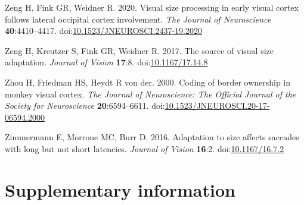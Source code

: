 \documentclass[
]{article}
\newlength{\cslhangindent}
\newlength{\cslentryspacingunit} %
\newenvironment{CSLReferences}[2] %
 {%
  \setlength{\parindent}{0pt}
  \ifodd #1
  \let\oldpar\par
  \def\par{\hangindent=\cslhangindent\oldpar}
  \fi
  \setlength{\parskip}{#2\cslentryspacingunit}
 }%
 {}
\begin{document}
\begin{CSLReferences}{1}{0}
\leavevmode{}%
Zeng H, Fink GR, Weidner R. 2020. Visual size processing in early visual cortex follows lateral occipital cortex involvement. \emph{The Journal of Neuroscience} \textbf{40}:4410--4417. doi:\href{https://doi.org/10.1523/JNEUROSCI.2437-19.2020}{10.1523/JNEUROSCI.2437-19.2020}

\leavevmode{}%
Zeng H, Kreutzer S, Fink GR, Weidner R. 2017. The source of visual size adaptation. \emph{Journal of Vision} \textbf{17}:8. doi:\href{https://doi.org/10.1167/17.14.8}{10.1167/17.14.8}

\leavevmode{}%
Zhou H, Friedman HS, Heydt R von der. 2000. Coding of border ownership in monkey visual cortex. \emph{The Journal of Neuroscience: The Official Journal of the Society for Neuroscience} \textbf{20}:6594--6611. doi:\href{https://doi.org/10.1523/JNEUROSCI.20-17-06594.2000}{10.1523/JNEUROSCI.20-17-06594.2000}

\leavevmode{}%
Zimmermann E, Morrone MC, Burr D. 2016. Adaptation to size affects saccades with long but not short latencies. \emph{Journal of Vision} \textbf{16}:2. doi:\href{https://doi.org/10.1167/16.7.2}{10.1167/16.7.2}

\end{CSLReferences}

\hypertarget{supplementary-information}{%
\section*{Supplementary information}\label{supplementary-information}}

\setcounter{table}{0}  \renewcommand{\thetable}{S\arabic{table}} \setcounter{figure}{0} \renewcommand{\thefigure}{S\arabic{figure}}
\end{document}
